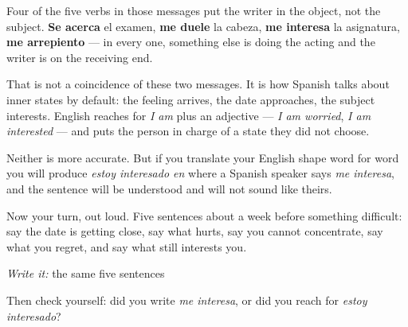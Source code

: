 \begin{culture}
Four of the five verbs in those messages put the writer in the object, not the subject. \textbf{Se acerca} el examen, \textbf{me duele} la cabeza, \textbf{me interesa} la asignatura, \textbf{me arrepiento} — in every one, something else is doing the acting and the writer is on the receiving end.

That is not a coincidence of these two messages. It is how Spanish talks about inner states by default: the feeling arrives, the date approaches, the subject interests. English reaches for \emph{I am} plus an adjective — \emph{I am worried}, \emph{I am interested} — and puts the person in charge of a state they did not choose.

Neither is more accurate. But if you translate your English shape word for word you will produce \emph{estoy interesado en} where a Spanish speaker says \emph{me interesa}, and the sentence will be understood and will not sound like theirs.
\end{culture}

\begin{tcolorbox}[breakable,colback=teal!4,colframe=teal!35!black,title={Before you move on}]
Now your turn, out loud. Five sentences about a week before something difficult: say the date is getting close, say what hurts, say you cannot concentrate, say what you regret, and say what still interests you.

\emph{Write it:} the same five sentences

Then check yourself: did you write \emph{me interesa}, or did you reach for \emph{estoy interesado}?
\end{tcolorbox}
